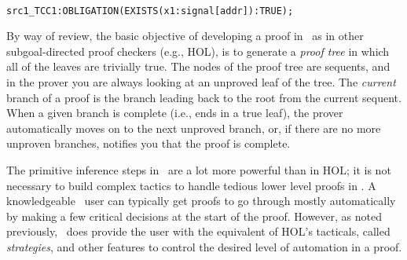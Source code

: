 \mbox{}

\noindent
\begin{boxedminipage}{\textwidth}
\begin{alltt}
{\smaller\smaller
% Existence TCC generated (line 17) for src1: signal[addr]
% May need to add an assuming clause to prove this.
  % unproved
src1_TCC1: OBLIGATION (EXISTS (x1: signal[addr]): TRUE);
}
\end{alltt}
\end{boxedminipage}

\mbox{}


By way of review, the basic objective of developing a proof in \pvs\
as in other subgoal-directed proof checkers (e.g., HOL), is to
generate a {\em proof tree\/} in which all of the leaves are trivially
true.  The nodes of the proof tree are sequents, and in the
prover you are always looking at an unproved leaf of the tree.
The {\em current\/} branch of a proof is the branch leading back to
the root from the current sequent.  When a given branch is complete
(i.e., ends in a true leaf), the prover automatically moves on to the
next unproved branch, or, if there are no more unproven branches,
notifies you that the proof is complete.

The primitive inference steps in \pvs\ are a lot more
powerful than in HOL; it is not necessary to build complex tactics to
handle tedious lower level proofs in \pvs\@.  A knowledgeable \pvs\
user can typically get proofs to go through mostly automatically by
making a few critical decisions at the start of the proof.  However,
as noted previously, \pvs\ does provide the user with the equivalent
of HOL's tacticals, called {\em strategies}, and other features to
control the desired level of automation in a proof.

